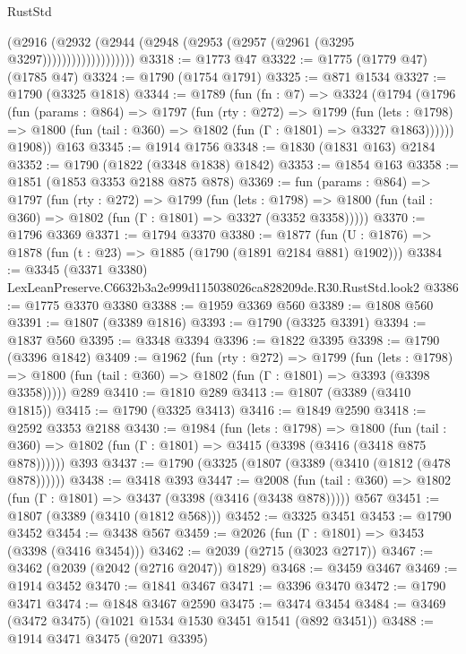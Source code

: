 \begin{lexlean}{RustStd}
\begin{coremodule}
                          (@2916
                            (@2932
                              (@2944 (@2948 (@2953 (@2957 (@2961 (@3295 @3297)))))))))))))))))))
@3318 := @1773 @47
@3322 := @1775 (@1779 @47) (@1785 @47)
@3324 := @1790 (@1754 @1791)
@3325 := @871 @1534
@3327 := @1790 (@3325 @1818)
@3344 := @1789
    (fun (fn : @7) =>
    @3324
      (@1794
        (@1796
          (fun (params : @864) =>
          @1797
            (fun (rty : @272) =>
            @1799
              (fun (lets : @1798) =>
              @1800 (fun (tail : @360) => @1802 (fun (Γ : @1801) => @3327 @1863))))))
        @1908))
    @163
@3345 := @1914 @1756
@3348 := @1830 (@1831 @163) @2184
@3352 := @1790 (@1822 (@3348 @1838) @1842)
@3353 := @1854 @163
@3358 := @1851 (@1853 @3353 @2188 @875 @878)
@3369 := fun (params : @864) =>
  @1797
    (fun (rty : @272) =>
    @1799
      (fun (lets : @1798) =>
      @1800 (fun (tail : @360) => @1802 (fun (Γ : @1801) => @3327 (@3352 @3358)))))
@3370 := @1796 @3369
@3371 := @1794 @3370
@3380 := @1877 (fun (U : @1876) => @1878 (fun (t : @23) => @1885 (@1790 (@1891 @2184 @881) @1902)))
@3384 := @3345 (@3371 @3380) LexLeanPreserve.C6632b3a2e999d115038026ca828209de.R30.RustStd.look2
@3386 := @1775 @3370 @3380
@3388 := @1959 @3369 @560
@3389 := @1808 @560
@3391 := @1807 (@3389 @1816)
@3393 := @1790 (@3325 @3391)
@3394 := @1837 @560
@3395 := @3348 @3394
@3396 := @1822 @3395
@3398 := @1790 (@3396 @1842)
@3409 := @1962
    (fun (rty : @272) =>
    @1799
      (fun (lets : @1798) =>
      @1800 (fun (tail : @360) => @1802 (fun (Γ : @1801) => @3393 (@3398 @3358)))))
    @289
@3410 := @1810 @289
@3413 := @1807 (@3389 (@3410 @1815))
@3415 := @1790 (@3325 @3413)
@3416 := @1849 @2590
@3418 := @2592 @3353 @2188
@3430 := @1984
    (fun (lets : @1798) =>
    @1800 (fun (tail : @360) => @1802 (fun (Γ : @1801) => @3415 (@3398 (@3416 (@3418 @875 @878))))))
    @393
@3437 := @1790 (@3325 (@1807 (@3389 (@3410 (@1812 (@478 @878))))))
@3438 := @3418 @393
@3447 := @2008
    (fun (tail : @360) => @1802 (fun (Γ : @1801) => @3437 (@3398 (@3416 (@3438 @878)))))
    @567
@3451 := @1807 (@3389 (@3410 (@1812 @568)))
@3452 := @3325 @3451
@3453 := @1790 @3452
@3454 := @3438 @567
@3459 := @2026 (fun (Γ : @1801) => @3453 (@3398 (@3416 @3454)))
@3462 := @2039 (@2715 (@3023 @2717))
@3467 := @3462 (@2039 (@2042 (@2716 @2047)) @1829)
@3468 := @3459 @3467
@3469 := @1914 @3452
@3470 := @1841 @3467
@3471 := @3396 @3470
@3472 := @1790 @3471
@3474 := @1848 @3467 @2590
@3475 := @3474 @3454
@3484 := @3469 (@3472 @3475) (@1021 @1534 @1530 @3451 @1541 (@892 @3451))
@3488 := @1914 @3471 @3475 (@2071 @3395)

\end{coremodule}
\end{lexlean}
